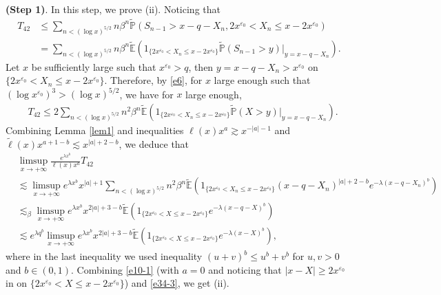 \documentclass[11pt]{article}
\numberwithin{equation}{section}
\begin{document}
\noindent
{\bf(Step 1)}. In this step, we prove (ii). Noticing that 
\begin{align}
	T_{42} & \leq \sum_{n< (\log x)^{5/2}}  n\beta^{n}\widetilde{\mathbb{P}}\left( S_{n-1}>x-q-X_n,   2x^{\varepsilon_0}< X_n \leq x-2x^{\varepsilon_0}\right) \nonumber\\
	& = \sum_{n< (\log x)^{5/2}}  n\beta^{n}\widetilde{\mathbb{E}}\left(1_{\{ 2x^{\varepsilon_0}< X_n \leq x-2x^{\varepsilon_0}\}}  \widetilde{\mathbb{P}} (S_{n-1}>y)|_{y= x-q-X_n}   \right).
\end{align}
Let $x$ be sufficiently large such that $x^{\varepsilon_0}>q$, then  $y=x-q-X_{n} > x^{\varepsilon_0}$ on $\{ 2x^{\varepsilon_0}< X_n \leq x-2x^{\varepsilon_0}\} $. Therefore, by \eqref{e6}, for $x$ large enough such that $ (\log x^{\varepsilon_0})^3> (\log x)^{5/2}$, we have for $x$ large enough, 
\begin{align}
	&T_{42}\leq 2\sum_{n< (\log x)^{5/2}}  n^2\beta^{n}\widetilde{\mathbb{E}}\left(1_{\{ 2x^{\varepsilon_0}< X_n \leq x-2x^{\varepsilon_0}\}}  \widetilde{\mathbb{P}} (X>y)|_{y= x-q-X_n}   \right).
\end{align}
Combining Lemma \ref{lem1} and inequalities $\ell(x)x^a \gtrsim x^{-|a|-1}$ and  $\widetilde{\ell}(x)x^{a+1-b}\lesssim x^{|a|+2-b}$, we deduce that 
\begin{align}\label{e34-3}
	& \limsup_{x\to+\infty} \frac{e^{\lambda x^b}}{\ell(x)x^a } T_{42} \nonumber\\
	& \lesssim \limsup_{x\to+\infty} e^{\lambda x^b}x^{|a|+1}\sum_{n< (\log x)^{5/2}}  n^2\beta^{n}\widetilde{\mathbb{E}}\left(1_{\{ 2x^{\varepsilon_0}< X_n \leq x-2x^{\varepsilon_0}\}} (x-q-X_n)^{|a|+2-b} e^{-\lambda (x-q-X_n)^b}   \right) \nonumber\\
	&\lesssim_\beta  \limsup_{x\to+\infty} e^{\lambda x^b}x^{2|a|+3-b} \widetilde{\mathbb{E}}\left(1_{\{ 2x^{\varepsilon_0}< X \leq x-2x^{\varepsilon_0}\}}   e^{-\lambda (x-q-X)^b}   \right) \nonumber\\
	&\lesssim e^{\lambda q^b} \limsup_{x\to+\infty} e^{\lambda x^b}x^{2|a|+3-b} \widetilde{\mathbb{E}}\left(1_{\{ 2x^{\varepsilon_0}< X \leq x-2x^{\varepsilon_0}\}}   e^{-\lambda (x-X)^b}   \right) ,
\end{align}
where in the last inequality we used inequality $(u+v)^b\leq u^b+ v^b$ for $u,v>0$ and $b\in (0,1)$.  Combining \eqref{e10-1} (with $a=0$ and noticing that $|x-X|\geq 2x^{\varepsilon_0}$ in on $\{ 2x^{\varepsilon_0}< X \leq x-2x^{\varepsilon_0}\}$) and \eqref{e34-3}, we get (ii). 
\end{document}
